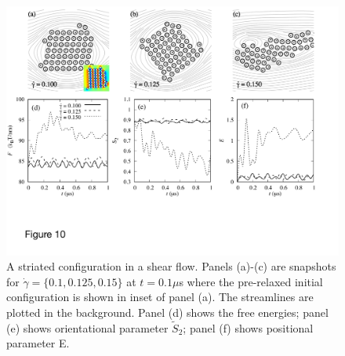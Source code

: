 \documentclass[prb,preprint,showpacs,preprintnumbers,amsmath,amssymb,longbibliography]{revtex4-1}
\begin{document}

\begin{figure}
  \begin{center}
\includegraphics[width=1.0\textwidth]{Figures/Figure10.pdf}        
  \end{center}
  \caption{\label{fig:BC3_shear} A striated configuration in a shear
  flow. Panels (a)-(c) are snapshots for $\dot \gamma = \{0.1, 0.125,
  0.15\}$ at $t=0.1\mu$s where the pre-relaxed initial configuration is
  shown in inset of panel (a). The streamlines are plotted in the
  background. Panel (d) shows the free energies; panel (e) shows
  orientational parameter $\tilde{S}_2$; panel (f) shows positional
  parameter E.}
\end{figure}
\end{document}
